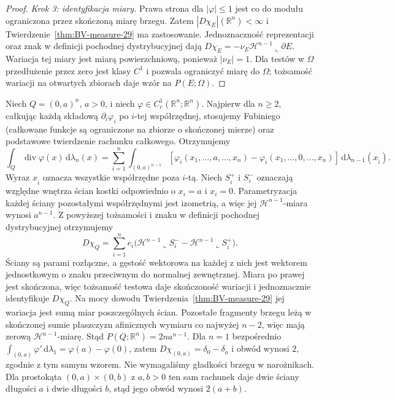 \begin{proof}
\emph{Krok 3: identyfikacja miary.}
Prawa strona dla $|\varphi|\le1$ jest co do modułu
ograniczona przez skończoną miarę brzegu. Zatem
$|D\chi_E|(\mathbb R^n)<\infty$ i
Twierdzenie~\ref{thm:BV-measure-29} ma zastosowanie.
Jednoznaczność reprezentacji oraz znak w definicji
pochodnej dystrybucyjnej dają
$D\chi_E=-\nu_E\mathcal H^{n-1}\llcorner\partial E$.
Wariacja tej miary jest miarą powierzchniową,
ponieważ $|\nu_E|=1$. Dla testów w $\Omega$
przedłużenie przez zero jest klasy $C^1$ i pozwala
ograniczyć miarę do $\Omega$; tożsamość wariacji
na otwartych zbiorach daje wzór na $P(E;\Omega)$.
\end{proof}

\begin{przyklad}
\label{ex:cube-perimeter-29}
Niech $Q=(0,a)^n$, $a>0$, i niech
$\varphi\in C_c^1(\mathbb R^n;\mathbb R^n)$.
Najpierw dla $n\ge2$, całkując każdą składową
$\partial_i\varphi_i$ po $i$-tej współrzędnej,
stosujemy Fubiniego (całkowane funkcje są ograniczone
na zbiorze o skończonej mierze) oraz podstawowe
twierdzenie rachunku całkowego. Otrzymujemy
\[
 \int_Q\operatorname{div}\varphi(x)\,\mathrm d\lambda_n(x)
 =\sum_{i=1}^n\int_{(0,a)^{n-1}}
 [\varphi_i(x_1,\ldots,a,\ldots,x_n)-
  \varphi_i(x_1,\ldots,0,\ldots,x_n)]
 \,\mathrm d\lambda_{n-1}(x_{\widehat i}).
\]
Wyraz $x_{\widehat i}$ oznacza wszystkie współrzędne
poza $i$-tą. Niech $S_i^+$ i $S_i^-$ oznaczają względne wnętrza
ścian kostki odpowiednio o $x_i=a$ i $x_i=0$.
Parametryzacja każdej ściany pozostałymi współrzędnymi
jest izometrią, a więc jej $\mathcal H^{n-1}$-miara
wynosi $a^{n-1}$. Z powyższej tożsamości i znaku
w definicji pochodnej dystrybucyjnej otrzymujemy
\[
 D\chi_Q=\sum_{i=1}^n e_i
 \bigl(\mathcal H^{n-1}\llcorner S_i^-
       -\mathcal H^{n-1}\llcorner S_i^+\bigr).
\]
Ściany są parami rozłączne, a gęstość wektorowa
na każdej z nich jest wektorem jednostkowym
o znaku przeciwnym do normalnej zewnętrznej.
Miara po prawej jest skończona, więc tożsamość
testowa daje skończoność wariacji i jednoznacznie
identyfikuje $D\chi_Q$. Na mocy dowodu
Twierdzenia~\ref{thm:BV-measure-29} jej wariacja
jest sumą miar poszczególnych ścian.
Pozostałe fragmenty brzegu leżą w skończonej sumie
płaszczyzn afinicznych wymiaru co najwyżej $n-2$,
więc mają zerową $\mathcal H^{n-1}$-miarę.
Stąd $P(Q;\mathbb R^n)=2na^{n-1}$.
Dla $n=1$ bezpośrednio
$\int_{(0,a)}\varphi'\,\mathrm d\lambda_1
=\varphi(a)-\varphi(0)$, zatem
$D\chi_{(0,a)}=\delta_0-\delta_a$ i obwód wynosi $2$,
zgodnie z tym samym wzorem. Nie wymagaliśmy
gładkości brzegu w narożnikach. Dla prostokąta
$(0,a)\times(0,b)$ z $a,b>0$ ten sam rachunek
daje dwie ściany długości $a$ i dwie długości $b$,
stąd jego obwód wynosi $2(a+b)$.
\end{przyklad}

